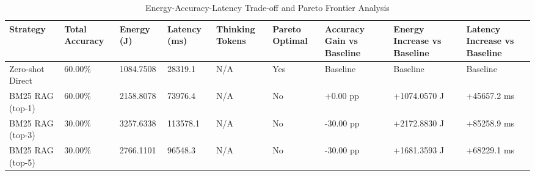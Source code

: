 \begin{table}
\caption{Energy-Accuracy-Latency Trade-off and Pareto Frontier Analysis}
\label{tab:tradeoff_comparison}
\begin{tabular}{lllllllll}
\toprule
Strategy & Total Accuracy & Energy (J) & Latency (ms) & Thinking Tokens & Pareto Optimal & Accuracy Gain vs Baseline & Energy Increase vs Baseline & Latency Increase vs Baseline \\
\midrule
Zero-shot Direct & 60.00\% & 1084.7508 & 28319.1 & N/A & Yes & Baseline & Baseline & Baseline \\
BM25 RAG (top-1) & 60.00\% & 2158.8078 & 73976.4 & N/A & No & +0.00 pp & +1074.0570 J & +45657.2 ms \\
BM25 RAG (top-3) & 30.00\% & 3257.6338 & 113578.1 & N/A & No & -30.00 pp & +2172.8830 J & +85258.9 ms \\
BM25 RAG (top-5) & 30.00\% & 2766.1101 & 96548.3 & N/A & No & -30.00 pp & +1681.3593 J & +68229.1 ms \\
\bottomrule
\end{tabular}
\end{table}

